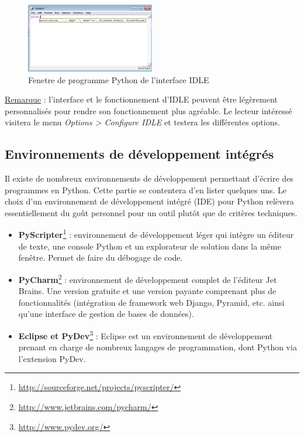 \documentclass[12pt, a4paper]{article}
\begin{document}
\begin{figure}[H]
	\center \includegraphics[width=0.5\textwidth]{img/idle_fenetre.png}
	\caption{Fenetre de programme Python de l'interface IDLE}
	\label{idle_fenetre}
\end{figure}

\underline{Remarque} : l'interface et le fonctionnement d'IDLE peuvent être légèrement personnalisés pour rendre son fonctionnement plus agréable. Le lecteur intéressé visitera le menu \textit{Options > Configure IDLE} et testera les différentes options.


\subsection{Environnements de développement intégrés}
Il existe de nombreux environnements de développement permettant d'écrire des programmes en Python. Cette partie se contentera d'en lister quelques uns. Le choix d'un environnement de développement intégré (IDE) pour Python relèvera essentiellement du goût personnel pour un outil plutôt que de critères techniques.

\begin{itemize}
	\item \textbf{PyScripter}\footnote{\url{http://sourceforge.net/projects/pyscripter/}} : environnement de développement léger qui intègre un éditeur de texte, une console Python et un explorateur de solution dans la même fenêtre. Permet de faire du débogage de code.
	\item \textbf{PyCharm}\footnote{\url{http://www.jetbrains.com/pycharm/}} : environnement de développement complet de l'éditeur Jet Brains. Une version gratuite et une version payante comprenant plus de fonctionnalités (intégration de framework web Django, Pyramid, etc. ainsi qu'une interface de gestion de bases de données).
	\item \textbf{Eclipse et PyDev}\footnote{\url{http://www.pydev.org/}} : Eclipse est un environnement de développement prenant en charge de nombreux langages de programmation, dont Python via l'extension PyDev.
\end{itemize}
\end{document}
